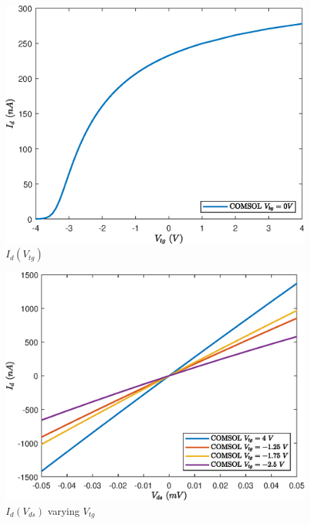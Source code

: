 \documentclass[12pt,a4paper,titlepage]{article}
\begin{document}
\begin{figure}[h]
	\centering
	\includegraphics[width=.8\textwidth]{Grafici/HfZrO2_Id(Vtg).eps} 
	\caption{$I_d(V_{tg})$}
	\label{fig:HfZrO2_Id(Vtg)}
\end{figure} 

\begin{figure}[h]
	\centering
	\includegraphics[width=.8\textwidth]{Grafici/HfZrO2_Id(Vds)_varying_Vtg.eps} 
	\caption{$I_d(V_{ds})$ varying $V_{tg}$}
	\label{fig:HfZrO2_Id(Vds)_varying_Vtg}
\end{figure} 

\clearpage
\newpage

\nocite{*}
\printbibliography
\end{document}
